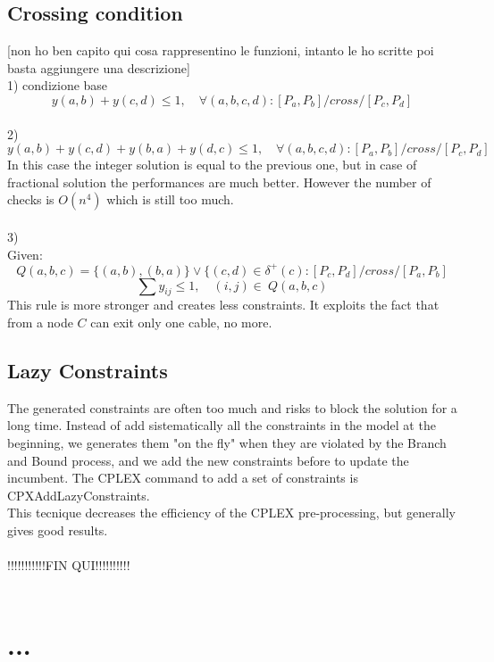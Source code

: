 \subsection{Crossing condition}
[non ho ben capito qui cosa rappresentino le funzioni, intanto le ho scritte poi basta aggiungere una descrizione]\\
1) condizione base
\[
y(a,b)+ y(c,d) \leq 1, \quad \forall (a,b,c,d): [P_a, P_b] / cross / [P_c, P_d]
\]
 \\
2) 
\[
y(a,b)+ y(c,d) + y(b,a) + y(d,c) \leq 1, \quad \forall (a,b,c,d): [P_a, P_b] / cross / [P_c, P_d]
\]
In this case the integer solution is equal to the previous one, but in case of fractional solution the performances are much better. However the number of checks is $O(n^4)$ which is still too much.\\ \\

3)\\ 
Given:
\[
Q(a,b,c) = \{(a,b), (b,a) \} \vee \{ (c,d) \in \delta^+ (c): [P_c, P_d] / cross / [P_a, P_b]
\]
\[
\sum y_{ij} \leq 1, \quad (i,j) \in \ Q(a,b,c)
\]
This rule is more stronger and creates less constraints. It exploits the fact that from a node $C$ can exit only one cable, no more. 

\subsection{Lazy Constraints}
The generated constraints are often too much and risks to block the solution for a long time. 
Instead of add sistematically all the constraints in the model at the beginning, we generates them "on the fly" when they are violated by the Branch and Bound process, and we add the new constraints before to update the incumbent. The CPLEX command to add a set of constraints is CPXAddLazyConstraints. \\
This tecnique decreases the efficiency of the CPLEX pre-processing, but generally gives good results. \\\\

!!!!!!!!!!!FIN QUI!!!!!!!!!!\\\\


\section{...}
